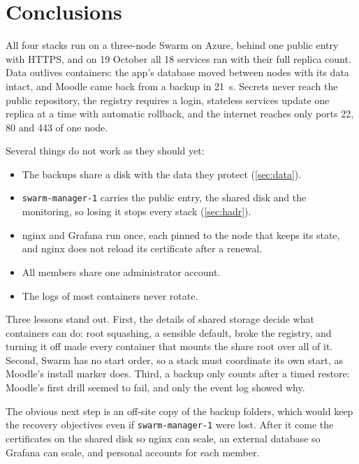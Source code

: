 \section{Conclusions}
\label{sec:conclusions}

All four stacks run on a three-node Swarm on Azure, behind one public
entry with HTTPS, and on 19 October all 18 services ran with their full
replica count. Data outlives containers: the app's database moved
between nodes with its data intact, and Moodle came back from a backup in
\qty{21}{\second}. Secrets never reach the public repository, the
registry requires a login, stateless services update one replica at a
time with automatic rollback, and the internet reaches only ports 22, 80
and 443 of one node.

Several things do not work as they should yet:
\begin{itemize}
  \item The backups share a disk with the data they protect
        (\cref{sec:data}).
  \item \texttt{swarm-manager-1} carries the public entry, the shared
        disk and the monitoring, so losing it stops every stack
        (\cref{sec:hadr}).
  \item nginx and Grafana run once, each pinned to the node that keeps
        its state, and nginx does not reload its certificate after a
        renewal.
  \item All members share one administrator account.
  \item The logs of most containers never rotate.
\end{itemize}

Three lessons stand out. First, the details of shared storage decide
what containers can do: root squashing, a sensible default, broke the
registry, and turning it off made every container that mounts the share
root over all of it. Second, Swarm has no start order, so a stack must
coordinate its own start, as Moodle's install marker does. Third, a
backup only counts after a timed restore: Moodle's first drill seemed to
fail, and only the event log showed why.

The obvious next step is an off-site copy of the backup folders, which
would keep the recovery objectives even if \texttt{swarm-manager-1} were
lost. After it come the certificates on the shared disk so nginx can
scale, an external database so Grafana can scale, and personal accounts
for each member.
